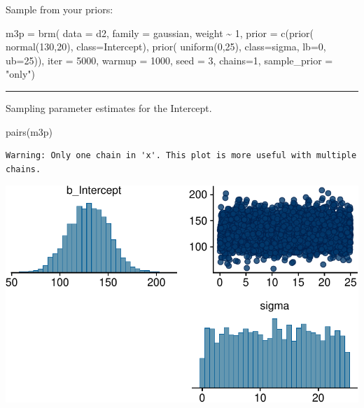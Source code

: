 \documentclass[
  letterpaper,
  DIV=11,
  numbers=noendperiod]{scrartcl}
\newenvironment{Shaded}{\begin{snugshade}}{\end{snugshade}}
\newcommand{\AttributeTok}[1]{\textcolor[rgb]{0.40,0.45,0.13}{#1}}
\newcommand{\DecValTok}[1]{\textcolor[rgb]{0.68,0.00,0.00}{#1}}
\newcommand{\FunctionTok}[1]{\textcolor[rgb]{0.28,0.35,0.67}{#1}}
\newcommand{\NormalTok}[1]{\textcolor[rgb]{0.00,0.23,0.31}{#1}}
\newcommand{\OtherTok}[1]{\textcolor[rgb]{0.00,0.23,0.31}{#1}}
\newcommand{\SpecialCharTok}[1]{\textcolor[rgb]{0.37,0.37,0.37}{#1}}
\newcommand{\StringTok}[1]{\textcolor[rgb]{0.13,0.47,0.30}{#1}}
\begin{document}
Sample from your priors:

\begin{Shaded}
\begin{Highlighting}[]
\NormalTok{m3p }\OtherTok{=} \FunctionTok{brm}\NormalTok{(}
  \AttributeTok{data =}\NormalTok{ d2,}
  \AttributeTok{family =}\NormalTok{ gaussian,}
\NormalTok{  weight }\SpecialCharTok{\textasciitilde{}} \DecValTok{1}\NormalTok{,}
  \AttributeTok{prior =} \FunctionTok{c}\NormalTok{(}\FunctionTok{prior}\NormalTok{( }\FunctionTok{normal}\NormalTok{(}\DecValTok{130}\NormalTok{,}\DecValTok{20}\NormalTok{), }\AttributeTok{class=}\NormalTok{Intercept),}
            \FunctionTok{prior}\NormalTok{( }\FunctionTok{uniform}\NormalTok{(}\DecValTok{0}\NormalTok{,}\DecValTok{25}\NormalTok{), }\AttributeTok{class=}\NormalTok{sigma, }\AttributeTok{lb=}\DecValTok{0}\NormalTok{, }\AttributeTok{ub=}\DecValTok{25}\NormalTok{)),  }
      \AttributeTok{iter =} \DecValTok{5000}\NormalTok{, }\AttributeTok{warmup =} \DecValTok{1000}\NormalTok{, }\AttributeTok{seed =} \DecValTok{3}\NormalTok{, }\AttributeTok{chains=}\DecValTok{1}\NormalTok{,}
  \AttributeTok{sample\_prior =} \StringTok{"only"}\NormalTok{)}
\end{Highlighting}
\end{Shaded}

\begin{center}\rule{0.5\linewidth}{0.5pt}\end{center}

Sampling parameter estimates for the Intercept.

\begin{Shaded}
\begin{Highlighting}[]
\FunctionTok{pairs}\NormalTok{(m3p)}
\end{Highlighting}
\end{Shaded}

\begin{verbatim}
Warning: Only one chain in 'x'. This plot is more useful with multiple chains.
\end{verbatim}

\includegraphics[width=17.1875in,height=\textheight]{lecture02-1_files/figure-pdf/unnamed-chunk-17-1.pdf}
\end{document}
